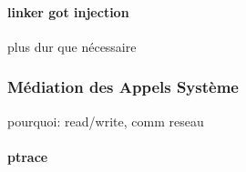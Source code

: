 
\paragraph{linker got injection}
plus dur que nécessaire

\subsubsection{Médiation des Appels Système}
pourquoi: read/write, comm reseau

\paragraph{ptrace}


